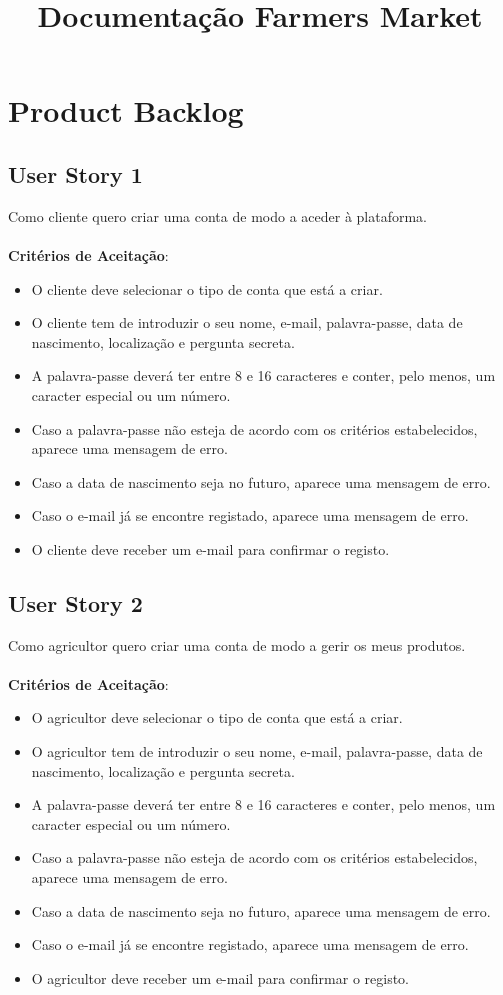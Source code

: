 \documentclass[a4paper,11pt]{article}
\title{Documentação Farmers Market}
\author{}
\date{}
\begin{document}
\maketitle
\vspace{-67pt}

\section{Product Backlog}
\subsection{User Story 1}
Como cliente quero criar uma conta de modo a aceder à plataforma.\\\\
\textbf{Critérios de Aceitação}:
\begin{itemize}
  \item O cliente deve selecionar o tipo de conta que está a criar.
  \item O cliente tem de introduzir o seu nome, e-mail, palavra-passe, data de nascimento, localização e pergunta secreta.
  \item A palavra-passe deverá ter entre 8 e 16 caracteres e conter, pelo menos, um caracter especial ou um número.
  \item Caso a palavra-passe não esteja de acordo com os critérios estabelecidos, aparece uma mensagem de erro.
  \item Caso a data de nascimento seja no futuro, aparece uma mensagem de erro.
  \item Caso o e-mail já se encontre registado, aparece uma mensagem de erro.
  \item O cliente deve receber um e-mail para confirmar o registo.
\end{itemize}
\subsection{User Story 2}
Como agricultor quero criar uma conta de modo a gerir os meus produtos.\\\\
\textbf{Critérios de Aceitação}:
\begin{itemize}
  \item O agricultor deve selecionar o tipo de conta que está a criar.
  \item O agricultor tem de introduzir o seu nome, e-mail, palavra-passe, data de nascimento, localização e pergunta secreta.
  \item A palavra-passe deverá ter entre 8 e 16 caracteres e conter, pelo menos, um caracter especial ou um número.
  \item Caso a palavra-passe não esteja de acordo com os critérios estabelecidos, aparece uma mensagem de erro.
  \item Caso a data de nascimento seja no futuro, aparece uma mensagem de erro.
  \item Caso o e-mail já se encontre registado, aparece uma mensagem de erro.
  \item O agricultor deve receber um e-mail para confirmar o registo.
\end{itemize}
\end{document}
